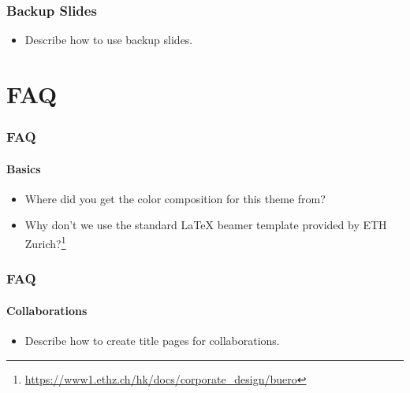 \documentclass{beamer}
\newcommand\latexsty[1]{\textsf{#1}}
\begin{document}
\begin{frame}
  \frametitle{Backup Slides}
  \begin{itemize}
  \item Describe how to use backup slides.
  \end{itemize}
\end{frame}


\section{FAQ}

\begin{frame}
  \frametitle{FAQ}
  \framesubtitle{Basics}
  \begin{itemize}
  \item Where did you get the color composition for this theme from?
  \item Why don't we use the standard \LaTeX{} \latexsty{beamer}
    template provided by
    ETH
    Zurich?\footnote{\url{https://www1.ethz.ch/hk/docs/corporate_design/buero}}
  \end{itemize}
\end{frame}

\begin{frame}
  \frametitle{FAQ}
  \framesubtitle{Collaborations}
  \begin{itemize}
  \item Describe how to create title pages for collaborations.
  \end{itemize}
\end{frame}




\end{document}
